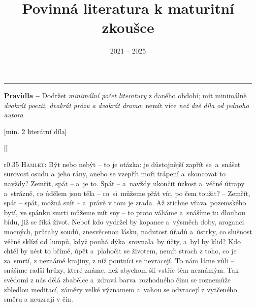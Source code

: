 \documentclass{extarticle} %
\author{\theauthor}
\title{Povinná literatura k maturitní zkoušce}
\date{2021 -- 2025}
\begin{document}
\changefontsize{7pt}


\tableofcontents

\vfill\noindent\begin{minipage}{\textwidth}
    {\textcolor{TOC}{\rule{\linewidth}{0.4pt}}\vspace{1em}
    \footnotesize\textbf{\color{TOC}Pravidla --} Dodržet \textit{\color{TOC}minimální počet literatury} z daného období;
    mít minimálně \textit{\color{TOC}dvakrát poezii, dvakrát prózu a dvakrát drama};
    nemít více \textit{\color{TOC}než dvě díla od jednoho autora}.}
\end{minipage}

\thispagestyle{empty}

\newpage


\newpage

\setcounter{page}{1}

[min. 2 literární díla]


\changefontsize{6.4pt}

[\drama]

\noindent\begin{wrapfigure}{r}{0.35\textwidth}
\tiny{}\setlength{\parindent}{3pt}\noindent\textsc{Hamlet:} Být nebo nebýt -- to je otázka:
je důstojnější zapřít se~a~snášet surovost osudu a~jeho rány, anebo se vzepřít moři trápení a~skoncovat to navždy?
Zemřít, spát -- a~je to.
Spát -- a~navždy ukončit úzkost a~věčné útrapy a~strázně, co údělem jsou těla -- co~si~můžeme přát víc, po čem toužit?
-- Zemřít, spát -- spát, možná snít -- a~právě v tom je zrada.
Až ztichne vřava~pozemského bytí, ve spánku smrti můžeme mít sny -- to proto váháme a~snášíme tu dlouhou bídu, již se říká život.
Neboť kdo vydržel by kopance a~výsměch doby, aroganci mocných, průtahy soudů, znesvěcenou lásku, nadutost úřadů a~ústrky, co slušnost věčně sklízí od lumpů, když pouhá dýka~srovnala~by účty, a~byl by klid?
Kdo chtěl by nést to břímě, úpět a~plahočit se životem, nemít strach z toho, co je za~smrtí, z neznámé krajiny, z níž poutníci se nevracejí.
To nám láme vůli -- snášíme radši hrůzy, které známe, než abychom šli vstříc těm neznámým.
Tak svědomí z nás dělá zbabělce a~zdravá barva~rozhodného činu se roznemůže zbledlou meditací, záměry velké významem a~vahou se odvracejí z vytčeného směru a neuzrají v čin.
\end{wrapfigure}
\end{document}

